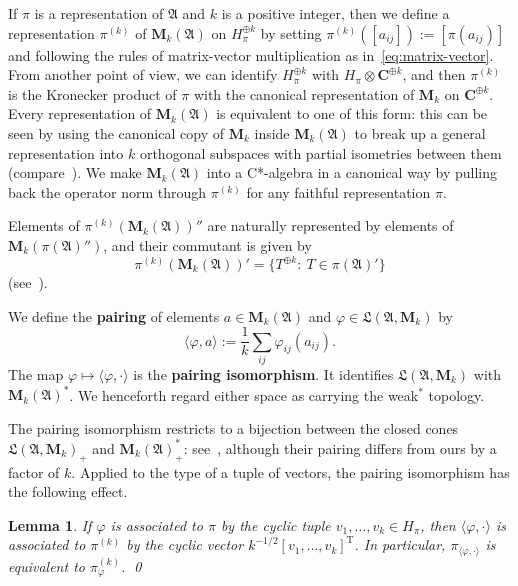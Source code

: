 \documentclass[12pt,a4paper]{article}
\numberwithin{equation}{section}
\newtheorem{lem}[thm]{Lemma}
\theoremstyle{remark}
\renewcommand{\rm}[1]{\mathrm{#1}}
\newcommand{\bbC}{\mathbf{C}}
\newcommand{\rmM}{\mathbf{M}}
\newcommand{\A}{\mathfrak{A}}
\newcommand{\frL}{\mathfrak{L}}
\renewcommand{\phi}{\varphi}
\begin{document}
If $\pi$ is a representation of $\A$ and $k$ is a positive integer, then we define a representation $\pi^{(k)}$ of $\rmM_k(\A)$ on $H_\pi^{\oplus k}$ by setting $\pi^{(k)}([a_{ij}]) := [\pi(a_{ij})]$ and following the rules of matrix-vector multiplication as in~\eqref{eq:matrix-vector}.  From another point of view, we can identify $H_\pi^{\oplus k}$ with $H_\pi\otimes \bbC^{\oplus k}$, and then $\pi^{(k)}$ is the Kronecker product of $\pi$ with the canonical representation of $\rmM_k$ on $\bbC^{\oplus k}$.  Every representation of $\rmM_k(\A)$ is equivalent to one of this form: this can be seen by using the canonical copy of $\rmM_k$ inside $\rmM_k(\A)$ to break up a general representation into $k$ orthogonal subspaces with partial isometries between them (compare~\cite[Subs. 9.2.2]{Dix--Cstar}).  We make $\rmM_k(\A)$ into a C*-algebra in a canonical way by pulling back the operator norm through $\pi^{(k)}$ for any faithful representation $\pi$.

Elements of $\pi^{(k)}(\rmM_k(\A))''$ are naturally represented by elements of $\rmM_k(\pi(\A)'')$, and their commutant is given by
\begin{equation}\label{eq:pi-k-commutant}
\pi^{(k)}(\rmM_k(\A))' = \{T^{\oplus k}:\ T \in \pi(\A)'\}
\end{equation}
(see~\cite[Prop. I.2.4(iii)]{Dix--vN}).

We define the \textbf{pairing} of elements $a \in \rmM_k(\A)$ and $\phi \in \frL(\A,\rmM_k)$ by
\begin{equation}\label{eq:pairing}
	\langle \phi,a\rangle := \frac{1}{k}\sum_{ij}\phi_{ij}(a_{ij}).
\end{equation}
The map $\phi\mapsto \langle \phi,\cdot\rangle$ is the \textbf{pairing isomorphism}.  It identifies $\frL(\A,\rmM_k)$ with $\rmM_k(\A)^\ast$.  We henceforth regard either space as carrying the weak$^\ast$ topology.

The pairing isomorphism restricts to a bijection between the closed cones $\frL(\A,\rmM_k)_+$ and $\rmM_k(\A)_+^\ast$: see~\cite[Prop. 1.5.14]{BroOza08}, although their pairing differs from ours by a factor of $k$.  Applied to the type of a tuple of vectors, the pairing isomorphism has the following effect.

\begin{lem}\label{lem:dilation-matrix-dilation}
	If $\phi$ is associated to $\pi$ by the cyclic tuple $v_1,\dots,v_k\in H_\pi$, then $\langle \phi,\cdot\rangle$ is associated to $\pi^{(k)}$ by the cyclic vector $k^{-1/2}[v_1,\dots,v_k]^\rm{T}$. In particular, $\pi_{\langle \phi,\cdot\rangle}$ is equivalent to $\pi_\phi^{(k)}$.
	\qed
\end{lem}
\end{document}
